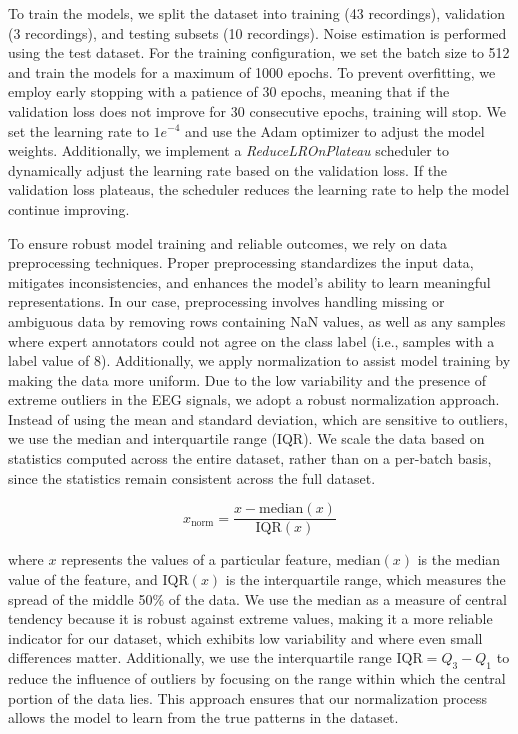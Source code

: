 To train the models, we split the dataset into training (43 recordings), validation (3 recordings), and testing subsets (10 recordings). Noise estimation is performed using the test dataset. For the training configuration, we set the batch size to 512 and train the models for a maximum of 1000 epochs. To prevent overfitting, we employ early stopping with a patience of 30 epochs, meaning that if the validation loss does not improve for 30 consecutive epochs, training will stop. We set the learning rate to $1e^{-4}$ and use the Adam optimizer to adjust the model weights. Additionally, we implement a \emph{ReduceLROnPlateau} scheduler to dynamically adjust the learning rate based on the validation loss. If the validation loss plateaus, the scheduler reduces the learning rate to help the model continue improving.

To ensure robust model training and reliable outcomes, we rely on data preprocessing techniques. Proper preprocessing standardizes the input data, mitigates inconsistencies, and enhances the model’s ability to learn meaningful representations. In our case, preprocessing involves handling missing or ambiguous data by removing rows containing NaN values, as well as any samples where expert annotators could not agree on the class label (i.e., samples with a label value of 8). Additionally, we apply normalization to assist model training by making the data more uniform. Due to the low variability and the presence of extreme outliers in the EEG signals, we adopt a robust normalization approach. Instead of using the mean and standard deviation, which are sensitive to outliers, we use the median and interquartile range (IQR). We scale the data based on statistics computed across the entire dataset, rather than on a per-batch basis, since the statistics remain consistent across the full dataset.

\begin{equation}
    x_{\text{norm}} = \frac{x - \text{median}(x)}{\text{IQR}(x)} \label{eq:robust_norm}
\end{equation}

where $x$ represents the values of a particular feature, $\text{median}(x)$ is the median value of the feature, and $\text{IQR}(x)$ is the interquartile range, which measures the spread of the middle 50\% of the data. We use the median as a measure of central tendency because it is robust against extreme values, making it a more reliable indicator for our dataset, which exhibits low variability and where even small differences matter. Additionally, we use the interquartile range $\text{IQR} = Q_3 - Q_1$ to reduce the influence of outliers by focusing on the range within which the central portion of the data lies. This approach ensures that our normalization process allows the model to learn from the true patterns in the dataset.

